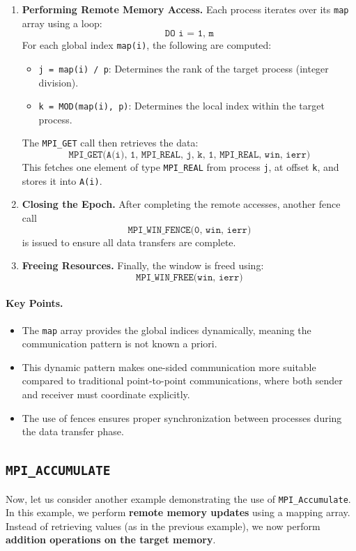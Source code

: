 \documentclass[12pt]{book}
\begin{document}
\begin{enumerate}
    \item \textbf{Performing Remote Memory Access.}
    Each process iterates over its \texttt{map} array using a loop:
    \[
    \texttt{DO i = 1, m}
    \]
    For each global index \texttt{map(i)}, the following are computed:
    \begin{itemize}
        \item \texttt{j = map(i) / p}: Determines the rank of the target process (integer division).
        \item \texttt{k = MOD(map(i), p)}: Determines the local index within the target process.
    \end{itemize}
    The \texttt{MPI\_GET} call then retrieves the data:
    \[
    \texttt{MPI\_GET(A(i), 1, MPI\_REAL, j, k, 1, MPI\_REAL, win, ierr)}
    \]
    This fetches one element of type \texttt{MPI\_REAL} from process \texttt{j}, at offset \texttt{k}, and stores it into \texttt{A(i)}.

    \item \textbf{Closing the Epoch.}
    After completing the remote accesses, another fence call
    \[
    \texttt{MPI\_WIN\_FENCE(0, win, ierr)}
    \]
    is issued to ensure all data transfers are complete.

    \item \textbf{Freeing Resources.}
    Finally, the window is freed using:
    \[
    \texttt{MPI\_WIN\_FREE(win, ierr)}
    \]
\end{enumerate}

\paragraph{Key Points.}
\begin{itemize}
    \item The \texttt{map} array provides the global indices dynamically, meaning the communication pattern is not known a priori.
    \item This dynamic pattern makes one-sided communication more suitable compared to traditional point-to-point communications, where both sender and receiver must coordinate explicitly.
    \item The use of fences ensures proper synchronization between processes during the data transfer phase.
\end{itemize}

\subsection{\texttt{MPI\_ACCUMULATE}}
Now, let us consider another example demonstrating the use of \texttt{MPI\_Accumulate}. 
In this example, we perform \textbf{remote memory updates} using a mapping array. 
Instead of retrieving values (as in the previous example), we now perform \textbf{addition operations on the target memory}.
\end{document}
